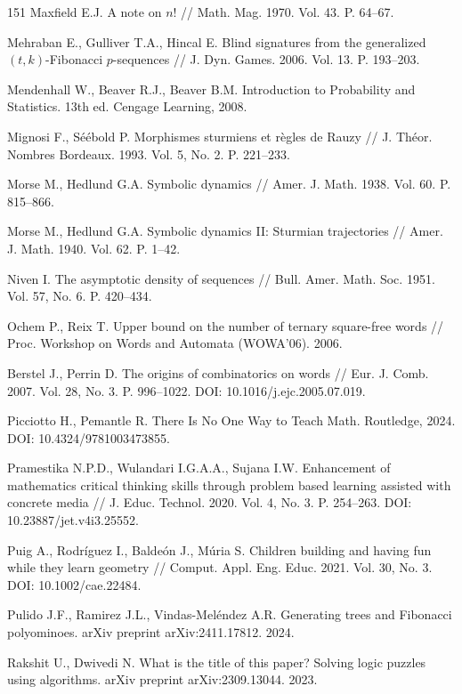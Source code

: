 \documentclass[a4paper,14pt]{extreport}
\theoremstyle{plain}
\theoremstyle{definition}
\theoremstyle{remark}
\begin{document}
\begin{thebibliography}{151}
		Maxfield E.J. A note on $n!$ // Math. Mag. 1970. Vol. 43. P. 64--67.
		
		Mehraban E., Gulliver T.A., Hincal E. Blind signatures from the generalized $(t,k)$-Fibonacci $p$-sequences // J. Dyn. Games. 2006. Vol. 13. P. 193--203.
		
		Mendenhall W., Beaver R.J., Beaver B.M. Introduction to Probability and Statistics. 13th ed. Cengage Learning, 2008.
		
		Mignosi F., Séébold P. Morphismes sturmiens et règles de Rauzy // J. Théor. Nombres Bordeaux. 1993. Vol. 5, No. 2. P. 221--233.
		
		Morse M., Hedlund G.A. Symbolic dynamics // Amer. J. Math. 1938. Vol. 60. P. 815--866.
		
		Morse M., Hedlund G.A. Symbolic dynamics II: Sturmian trajectories // Amer. J. Math. 1940. Vol. 62. P. 1--42.
		
		Niven I. The asymptotic density of sequences // Bull. Amer. Math. Soc. 1951. Vol. 57, No. 6. P. 420--434.
		
		Ochem P., Reix T. Upper bound on the number of ternary square-free words // Proc. Workshop on Words and Automata (WOWA'06). 2006.
		
		Berstel J., Perrin D. The origins of combinatorics on words // Eur. J. Comb. 2007. Vol. 28, No. 3. P. 996--1022. DOI: 10.1016/j.ejc.2005.07.019.
		
		Picciotto H., Pemantle R. There Is No One Way to Teach Math. Routledge, 2024. DOI: 10.4324/9781003473855.
		
		Pramestika N.P.D., Wulandari I.G.A.A., Sujana I.W. Enhancement of mathematics critical thinking skills through problem based learning assisted with concrete media // J. Educ. Technol. 2020. Vol. 4, No. 3. P. 254--263. DOI: 10.23887/jet.v4i3.25552.
		
		Puig A., Rodríguez I., Baldeón J., Múria S. Children building and having fun while they learn geometry // Comput. Appl. Eng. Educ. 2021. Vol. 30, No. 3. DOI: 10.1002/cae.22484.
		
		Pulido J.F., Ramirez J.L., Vindas-Meléndez A.R. Generating trees and Fibonacci polyominoes. arXiv preprint arXiv:2411.17812. 2024.
		
		Rakshit U., Dwivedi N. What is the title of this paper? Solving logic puzzles using algorithms. arXiv preprint arXiv:2309.13044. 2023.
		

\end{thebibliography}
\end{document}

